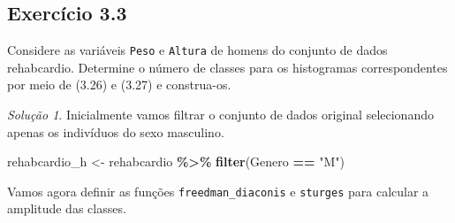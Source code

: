 \documentclass[
]{latex/krantz}
\newenvironment{Shaded}{\begin{snugshade}}{\end{snugshade}}
\newcommand{\AttributeTok}[1]{\textcolor[rgb]{0.13,0.29,0.53}{#1}}
\newcommand{\ConstantTok}[1]{\textcolor[rgb]{0.56,0.35,0.01}{#1}}
\newcommand{\ControlFlowTok}[1]{\textcolor[rgb]{0.13,0.29,0.53}{\textbf{#1}}}
\newcommand{\DecValTok}[1]{\textcolor[rgb]{0.00,0.00,0.81}{#1}}
\newcommand{\FloatTok}[1]{\textcolor[rgb]{0.00,0.00,0.81}{#1}}
\newcommand{\FunctionTok}[1]{\textcolor[rgb]{0.13,0.29,0.53}{\textbf{#1}}}
\newcommand{\NormalTok}[1]{#1}
\newcommand{\OtherTok}[1]{\textcolor[rgb]{0.56,0.35,0.01}{#1}}
\newcommand{\SpecialCharTok}[1]{\textcolor[rgb]{0.81,0.36,0.00}{\textbf{#1}}}
\newcommand{\StringTok}[1]{\textcolor[rgb]{0.31,0.60,0.02}{#1}}
\theoremstyle{definition}
\theoremstyle{definition}
\theoremstyle{definition}
\theoremstyle{definition}
\theoremstyle{remark}
\newtheorem*{solution}{Solução}
\begin{document}
\hypertarget{exr3-3}{%
\subsection*{Exercício 3.3}\label{exr3-3}}

Considere as variáveis \texttt{Peso} e \texttt{Altura} de homens do conjunto de dados rehabcardio. Determine o número de classes para os histogramas correspondentes por meio de (3.26) e (3.27) e construa-os.

\begin{solution}
Inicialmente vamos filtrar o conjunto de dados original selecionando apenas os indivíduos do sexo masculino.

\begin{Shaded}
\begin{Highlighting}[]
\NormalTok{rehabcardio\_h }\OtherTok{\textless{}{-}}\NormalTok{ rehabcardio }\SpecialCharTok{\%\textgreater{}\%}
                    \FunctionTok{filter}\NormalTok{(Genero }\SpecialCharTok{==} \StringTok{"M"}\NormalTok{)}
\end{Highlighting}
\end{Shaded}

Vamos agora definir as funções \texttt{freedman\_diaconis} e \texttt{sturges} para calcular a amplitude das classes.

\begin{Shaded}
\end{Shaded}
\end{solution}
\end{document}
